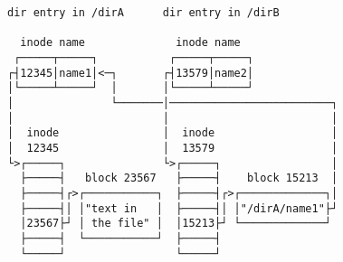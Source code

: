 \documentclass[varwidth=50em,crop]{standalone}
\begin{document}
\begin{verbatim}
dir entry in /dirA      dir entry in /dirB
                                  
  inode name              inode name 
 ┌─────┬─────┐           ┌─────┬─────┐
┌┤12345│name1│<─┐       ┌┤13579│name2│
│└─────┴─────┘  │       │└─────┴─────┘
│               └───────│─────────────────────────┐
│                       │                         │
│  inode                │  inode                  │
│  12345                │  13579                  │
└>┌─────┐               └>┌─────┐                 │
  ├─────┤   block 23567   ├─────┤    block 15213  │
  ├─────┤┌>┌───────────┐  ├─────┤┌>┌─────────────┐│
  ├─────┤│ │"text in   │  ├─────┤│ │"/dirA/name1"├┘
  │23567├┘ │ the file" │  │15213├┘ └─────────────┘
  ├─────┤  └───────────┘  ├─────┤  
  └─────┘                 └─────┘
\end{verbatim}
\end{document}
